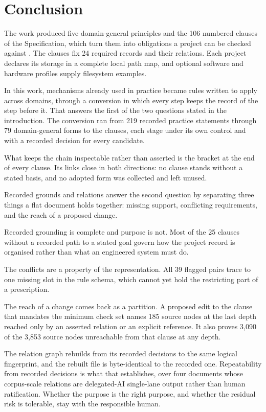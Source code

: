 \section{Conclusion}\label{sec:conclusion}

The work produced five domain-general principles and the 106 numbered clauses of the Specification, which turn them into obligations a project can be checked against \citep{tbf2026,pss2026}. The clauses fix 24 required records and their relations. Each project declares its storage in a complete local path map, and optional software and hardware profiles supply filesystem examples.

In this work, mechanisms already used in practice became rules written to apply across domains, through a conversion in which every step keeps the record of the step before it. That answers the first of the two questions stated in the introduction. The conversion ran from 219 recorded practice statements through 79 domain-general forms to the clauses, each stage under its own control and with a recorded decision for every candidate.

What keeps the chain inspectable rather than asserted is the bracket at the end of every clause. Its links close in both directions: no clause stands without a stated basis, and no adopted form was collected and left unused.

Recorded grounds and relations answer the second question by separating three things a flat document holds together: missing support, conflicting requirements, and the reach of a proposed change.

Recorded grounding is complete and purpose is not. Most of the 25 clauses without a recorded path to a stated goal govern how the project record is organised rather than what an engineered system must do.

The conflicts are a property of the representation. All 39 flagged pairs trace to one missing slot in the rule schema, which cannot yet hold the restricting part of a prescription.

The reach of a change comes back as a partition. A proposed edit to the clause that mandates the minimum check set names 185 source nodes at the last depth reached only by an asserted relation or an explicit reference. It also proves 3{,}090 of the 3{,}853 source nodes unreachable from that clause at any depth.

The relation graph rebuilds from its recorded decisions to the same logical fingerprint, and the rebuilt file is byte-identical to the recorded one. Repeatability from recorded decisions is what that establishes, over four documents whose corpus-scale relations are delegated-AI single-lane output rather than human ratification. Whether the purpose is the right purpose, and whether the residual risk is tolerable, stay with the responsible human.

